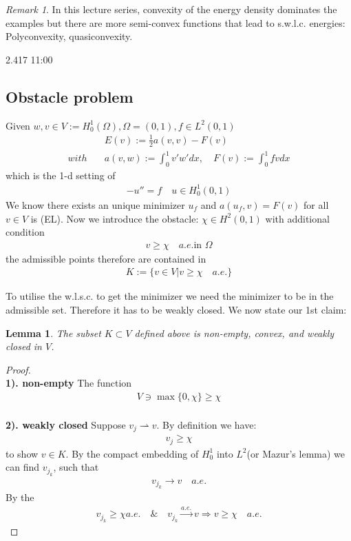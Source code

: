 \documentclass[a4paper,12pt,oneside,fleqn]{book}
\newtheorem{lemma}[theorem]{Lemma}
\theoremstyle{definition}
\theoremstyle{remark}
\newtheorem*{remark}{Remark}
\begin{document}
\begin{remark}
In this lecture series, convexity of the energy density dominates the examples but there are more semi-convex functions that lead to s.w.l.c. energies: Polyconvexity, quasiconvexity.	
\end{remark}

2.417
11:00


\subsection{Obstacle problem}
Given $w, v \in V := H_0^1(\Omega), \Omega = (0, 1), f \in L^2(0, 1)$
\begin{align*}
	&E(v):= \frac{1}{2} a(v, v) - F(v)\\
	with \quad
	&a(v, w):= \int_0^1 v'w'dx, \quad F(v):= \int_0^1fv dx
\end{align*}
which is the 1-d setting of 
\begin{align*}
	-u'' = f \quad u \in H^1_0(0, 1)
\end{align*}
We know there exists an unique minimizer $u_f$ and $a(u_f, v) = F(v)$ for all $v \in V$ is (EL). Now we introduce the obstacle: $\chi \in H^2(0, 1)$ with additional condition 
\begin{align*}
	v \ge \chi \quad a.e. \text{in } \Omega
\end{align*}
the admissible points therefore are contained in 
\begin{align*}
	K:= \{ v \in V| v \geq \chi \quad a.e. \}
\end{align*}

To utilise the w.l.s.c. to get the minimizer we need the minimizer to be in the admissible set. Therefore it has to be weakly closed. We now state our 1st claim:
\begin{lemma}
	The subset $K \subset V$ defined above is non-empty, convex, and weakly  closed in $V$. 
\end{lemma}
\begin{proof}\quad\\
\textbf{1).  non-empty} The function
\begin{align*}
	 V \ni \max\{0, \chi\} \ge \chi
\end{align*}\quad\\
\textbf{2). weakly closed }
	Suppose  $v_j \rightharpoonup v$. By definition we have:
	\begin{align*}
		v_j \ge \chi
	\end{align*} to show $v \in K$. By the compact embedding of $H^1_0$ into $L^2$(or Mazur's lemma) we can find $v_{j_k}$, such that
	\begin{align*}
		v_{j_k} \rightarrow v \quad a.e.
	\end{align*}
	By the 
	\begin{align*}
			v_{j_k} \ge \chi a.e.\quad \& \quad v_{j_k} \overset{a.e.}{\rightarrow} v \Rightarrow v \geq \chi \quad a.e.
	\end{align*}

\end{proof}
\end{document}
